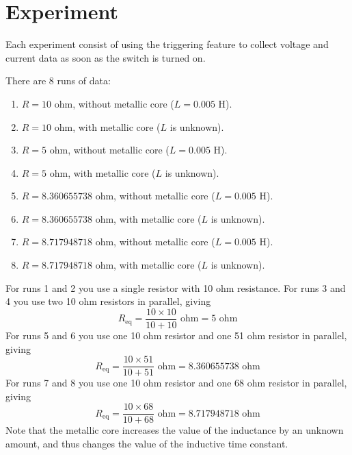 \section{Experiment}
%
Each experiment consist of using the triggering feature to collect voltage and current data as soon as the switch is turned on.

There are 8 runs of data:
\begin{enumerate}
	\item $R = 10$ ohm, without metallic core ($L = 0.005$ H).
	\item $R = 10$ ohm, with metallic core ($L$ is unknown).
	\item $R = 5$ ohm, without metallic core ($L = 0.005$ H).
	\item $R = 5$ ohm, with metallic core ($L$ is unknown).
	\item $R = 8.360655738$ ohm, without metallic core ($L = 0.005$ H).
	\item $R = 8.360655738$ ohm, with metallic core ($L$ is unknown).
	\item $R = 8.717948718$ ohm, without metallic core ($L = 0.005$ H).
	\item $R = 8.717948718$ ohm, with metallic core ($L$ is unknown).
\end{enumerate}
For runs 1 and 2 you use a single resistor with 10 ohm resistance. For runs 3 and 4 you use two 10 ohm resistors in parallel, giving
\begin{equation}
	R_{\text{eq}} = \frac{10 \times 10}{10 + 10} \text{ ohm} = 5 \text{ ohm}
\end{equation}
For runs 5 and 6 you use one 10 ohm resistor and one 51 ohm resistor in parallel, giving
\begin{equation}
	R_{\text{eq}} = \frac{10 \times 51}{10 + 51} \text{ ohm} = 8.360655738 \text{ ohm}
\end{equation}
For runs 7 and 8 you use one 10 ohm resistor and one 68 ohm resistor in parallel, giving
\begin{equation}
	R_{\text{eq}} = \frac{10 \times 68}{10 + 68} \text{ ohm} = 8.717948718 \text{ ohm}
\end{equation}
Note that the metallic core increases the value of the inductance by an unknown amount, and thus changes the value of the inductive time constant.
%
